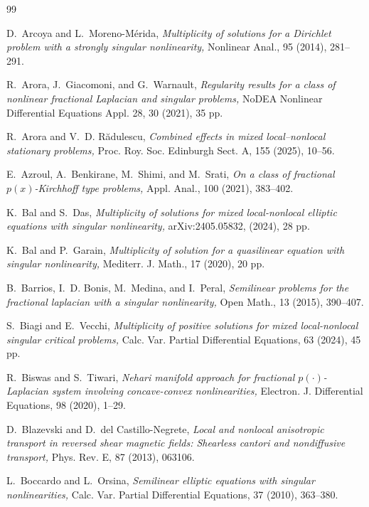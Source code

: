 \documentclass[11pt]{article}
\begin{document}
 
\begin{thebibliography}{99}

D.~Arcoya and L.~Moreno-Mérida,
{\it Multiplicity of solutions for a {D}irichlet problem with a strongly
  singular nonlinearity,}
Nonlinear Anal., 95 (2014), 281--291.

R.~Arora, J.~Giacomoni, and G.~Warnault,
{\it Regularity results for a class of nonlinear fractional Laplacian and
  singular problems,}
NoDEA Nonlinear Differential Equations Appl. 28, 30 (2021), 35 pp.

R.~Arora and V.~D. R{\u{a}}dulescu,
{\it Combined effects in mixed local--nonlocal stationary problems,}
Proc. Roy. Soc. Edinburgh Sect. A, 155 (2025), 10--56.

E.~Azroul, A.~Benkirane, M.~Shimi, and M.~Srati,
{\it On a class of fractional {$p(x)$}-{K}irchhoff type problems,}
Appl. Anal., 100 (2021), 383--402.

K.~Bal and S.~Das,
{\it Multiplicity of solutions for mixed local-nonlocal elliptic equations with singular nonlinearity,} arXiv:2405.05832, (2024), 28 pp.

K.~Bal and P.~Garain,
{\it Multiplicity of solution for a quasilinear equation with singular
  nonlinearity,}
Mediterr. J. Math., 17 (2020), 20 pp.

B.~Barrios, I.~D. Bonis, M.~Medina, and I.~Peral,
{\it Semilinear problems for the fractional laplacian with a singular
  nonlinearity,} Open Math., 13 (2015), 390--407.

S.~Biagi and E.~Vecchi,
{\it Multiplicity of positive solutions for mixed local-nonlocal singular critical problems,}
Calc. Var. Partial Differential Equations, 63 (2024), 45 pp.

R.~Biswas and S.~Tiwari,
{\it Nehari manifold approach for fractional {$p(\cdot)$}-{L}aplacian
  system involving concave-convex nonlinearities,}
Electron. J. Differential Equations,  98 (2020), 1--29.

D.~Blazevski and D.~del Castillo-Negrete,
{\it Local and nonlocal anisotropic transport in reversed shear magnetic
  fields: Shearless cantori and nondiffusive transport,}
Phys. Rev. E, 87 (2013), 063106.

L.~Boccardo and L.~Orsina,
{\it Semilinear elliptic equations with singular nonlinearities,}
Calc. Var. Partial Differential Equations, 37 (2010), 363--380.


\end{thebibliography}
\end{document}
